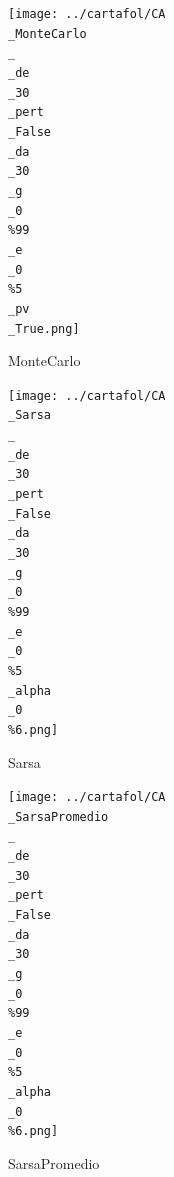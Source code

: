 \documentclass{article}
\begin{document}
		\begin{figure}[htbp]
    \centering
    \begin{minipage}{0.45\textwidth}
        \centering
	\texttt{[image: ../cartafol/CA\\\_MonteCarlo\\\_\\\_de\\\_30\\\_pert\\\_False\\\_da\\\_30\\\_g\\\_0\\\%99\\\_e\\\_0\\\%5\\\_pv\\\_True.png]}
\caption*{MonteCarlo}

    \end{minipage}
    \hfill
    \begin{minipage}{0.45\textwidth}
        \centering
	\texttt{[image: ../cartafol/CA\\\_Sarsa\\\_\\\_de\\\_30\\\_pert\\\_False\\\_da\\\_30\\\_g\\\_0\\\%99\\\_e\\\_0\\\%5\\\_alpha\\\_0\\\%6.png]}
\caption*{Sarsa}

    \end{minipage}
    \hfill
    \begin{minipage}{0.45\textwidth}
        \centering
	\texttt{[image: ../cartafol/CA\\\_SarsaPromedio\\\_\\\_de\\\_30\\\_pert\\\_False\\\_da\\\_30\\\_g\\\_0\\\%99\\\_e\\\_0\\\%5\\\_alpha\\\_0\\\%6.png]}
\caption*{SarsaPromedio}


\end{minipage}
\end{figure}
\end{document}
